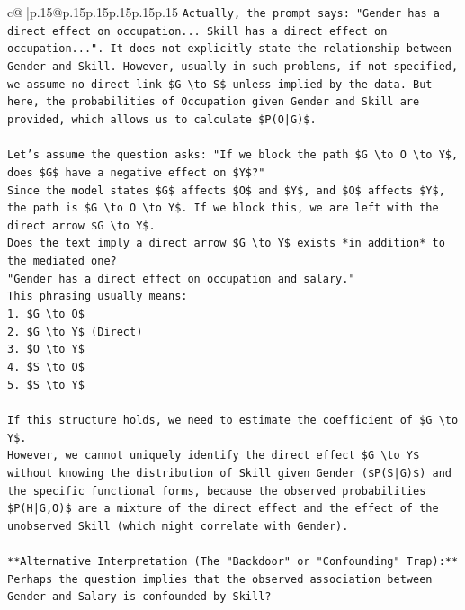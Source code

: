 \documentclass{article}
\begin{document}
{\begin{supertabular}{c@{$\;$}|p{.15\linewidth}@{}p{.15\linewidth}p{.15\linewidth}p{.15\linewidth}p{.15\linewidth}p{.15\linewidth}}
{{{\texttt{Actually, the prompt says: "Gender has a direct effect on occupation... Skill has a direct effect on occupation...". It does not explicitly state the relationship between Gender and Skill. However, usually in such problems, if not specified, we assume no direct link \$G \textbackslash{}to S\$ unless implied by the data. But here, the probabilities of Occupation given Gender and Skill are provided, which allows us to calculate \$P(O|G)\$.} \\
\\ 
\texttt{Let's assume the question asks: "If we block the path \$G \textbackslash{}to O \textbackslash{}to Y\$, does \$G\$ have a negative effect on \$Y\$?"} \\
\texttt{Since the model states \$G\$ affects \$O\$ and \$Y\$, and \$O\$ affects \$Y\$, the path is \$G \textbackslash{}to O \textbackslash{}to Y\$. If we block this, we are left with the direct arrow \$G \textbackslash{}to Y\$.} \\
\texttt{Does the text imply a direct arrow \$G \textbackslash{}to Y\$ exists *in addition* to the mediated one?} \\
\texttt{"Gender has a direct effect on occupation and salary."} \\
\texttt{This phrasing usually means:} \\
\texttt{1.  \$G \textbackslash{}to O\$} \\
\texttt{2.  \$G \textbackslash{}to Y\$ (Direct)} \\
\texttt{3.  \$O \textbackslash{}to Y\$} \\
\texttt{4.  \$S \textbackslash{}to O\$} \\
\texttt{5.  \$S \textbackslash{}to Y\$} \\
\\ 
\texttt{If this structure holds, we need to estimate the coefficient of \$G \textbackslash{}to Y\$.} \\
\texttt{However, we cannot uniquely identify the direct effect \$G \textbackslash{}to Y\$ without knowing the distribution of Skill given Gender (\$P(S|G)\$) and the specific functional forms, because the observed probabilities \$P(H|G,O)\$ are a mixture of the direct effect and the effect of the unobserved Skill (which might correlate with Gender).} \\
\\ 
\texttt{**Alternative Interpretation (The "Backdoor" or "Confounding" Trap):**} \\
\texttt{Perhaps the question implies that the observed association between Gender and Salary is confounded by Skill?} \\
}}}
\end{supertabular}}
\end{document}
